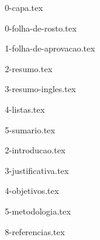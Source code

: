 \documentclass{revisaobibliografica}
\begin{document}


{0-capa.tex}

{0-folha-de-rosto.tex}

{1-folha-de-aprovacao.tex}

{2-resumo.tex}

{3-resumo-ingles.tex}

{4-listas.tex}

{5-sumario.tex}


{2-introducao.tex}

{3-justificativa.tex}

{4-objetivos.tex}

{5-metodologia.tex}

{8-referencias.tex}
\end{document}
